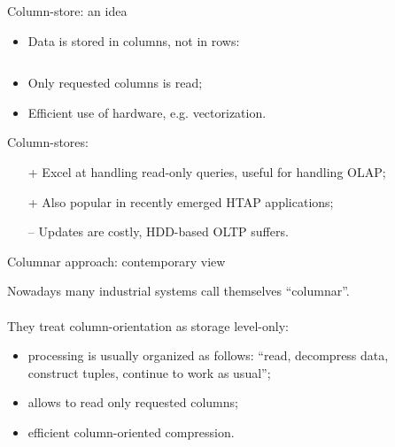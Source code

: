 \documentclass[compress, dvipsnames, unicode]{beamer}
\begin{document}
\begin{frame}{Column-store: an idea}
\begin{itemize}
	\item Data is stored in columns, not in rows:
\end{itemize}
\begin{columns}
	\begin{column}{0.35\textwidth}
		\begin{adjustbox}{max width=1.0\textwidth}
						
		\end{adjustbox}
	\end{column}%
	\begin{column}{0.47\textwidth}
		\begin{adjustbox}{max width=1.0\textwidth}
			
		\end{adjustbox}
	\end{column}
\end{columns}
\vspace{3mm}
\begin{itemize}
	\item Only requested columns is read;
	\item Efficient use of hardware, e.g. vectorization.
\end{itemize}
\vspace{3mm}
Column-stores:
\begin{itemize}
	\item[+] Excel at handling read-only queries, useful for handling OLAP;
	\item[+] Also popular in recently emerged HTAP applications;
	\item[--] Updates are costly, HDD-based OLTP suffers.
\end{itemize}

\end{frame}


\begin{frame}{Columnar approach: contemporary view}

Nowadays many industrial systems call themselves ``columnar''.\\~\\

They treat column-orientation as storage level-only:
\begin{itemize}
	\setlength\itemsep{0.5em}		
	\item processing is usually organized as follows: ``read, decompress data,\\ construct tuples, continue to work as usual'';
    \item allows to read only requested columns;
	\item efficient column-oriented compression.
\end{itemize}

\end{frame}
\end{document}

